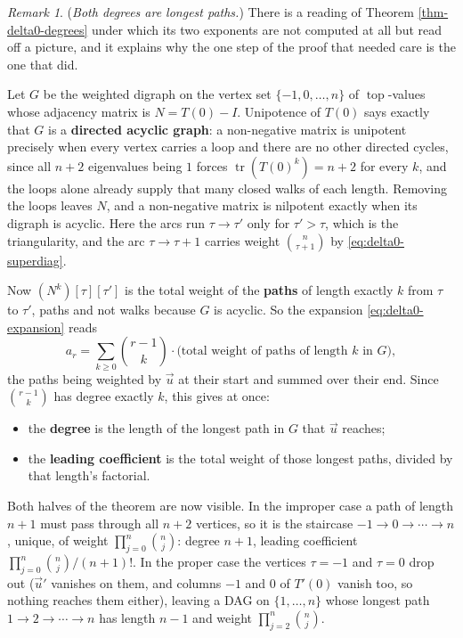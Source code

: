 \documentclass[11pt, a4paper, abstract=yes]{scrartcl}
\theoremstyle{definition}
\theoremstyle{remark}
\newtheorem{remark}[definition]{Remark}
\theoremstyle{plain}
\newcommand{\tp}{\operatorname{top}}
\begin{document}
\begin{remark}
(\emph{Both degrees are longest paths.}) There is a reading of Theorem \ref{thm-delta0-degrees} under which
its two exponents are not computed at all but read off a picture, and it explains why the one step of
the proof that needed care is the one that did.

Let \(G\) be the weighted digraph on the vertex set \(\lbrace-1,0,\dots,n\rbrace\) of \(\tp\)-values
whose adjacency matrix is \(N=T(0)-I\). Unipotence of \(T(0)\) says exactly that \(G\) is a \textbf{directed
acyclic graph}: a non-negative matrix is unipotent precisely when every vertex carries a loop and
there are no other directed cycles, since all \(n+2\) eigenvalues being \(1\) forces
\(\operatorname{tr}(T(0)^k)=n+2\) for every \(k\), and the loops alone already supply that many closed
walks of each length. Removing the loops leaves \(N\), and a non-negative matrix is nilpotent exactly
when its digraph is acyclic. Here the arcs run \(\tau\to\tau'\) only for \(\tau'>\tau\), which is the
triangularity, and the arc \(\tau\to\tau+1\) carries weight \(\binom n{\tau+1}\) by
\eqref{eq:delta0-superdiag}.

Now \((N^k)[\tau][\tau']\) is the total weight of the \textbf{paths} of length exactly \(k\) from \(\tau\) to
\(\tau'\), paths and not walks because \(G\) is acyclic. So the expansion
\eqref{eq:delta0-expansion} reads
\begin{equation}\label{eq:delta0-paths}
  a_r=\sum_{k\ge0}\binom{r-1}k\cdot\bigl(\text{total weight of paths of length }k\text{ in }G\bigr),
\end{equation}
the paths being weighted by \(\vec u\) at their start and summed over their end. Since
\(\binom{r-1}k\) has degree exactly \(k\), this gives at once:

\begin{itemize}
\item the \textbf{\textbf{degree}} is the length of the longest path in \(G\) that \(\vec u\) reaches;
\item the \textbf{\textbf{leading coefficient}} is the total weight of those longest paths, divided by that length's
factorial.
\end{itemize}

Both halves of the theorem are now visible. In the improper case a path of length \(n+1\) must pass
through all \(n+2\) vertices, so it is the staircase \(-1\to0\to\cdots\to n\), unique, of weight
\(\prod_{j=0}^n\binom nj\): degree \(n+1\), leading coefficient
\(\prod_{j=0}^n\binom nj\big/(n+1)!\). In the proper case the vertices \(\tau=-1\) and \(\tau=0\) drop
out (\(\vec u'\) vanishes on them, and columns \(-1\) and \(0\) of \(T'(0)\) vanish too, so nothing
reaches them either), leaving a DAG on \(\lbrace1,\dots,n\rbrace\) whose longest path
\(1\to2\to\cdots\to n\) has length \(n-1\) and weight \(\prod_{j=2}^n\binom nj\).


\end{remark}
\end{document}
